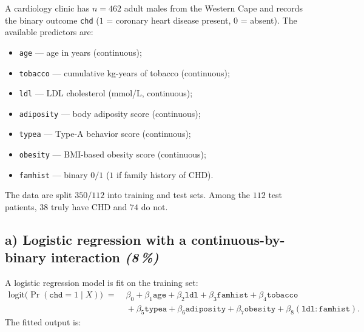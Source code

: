 \documentclass[11pt,a4paper]{article}
\newcommand{\subpoints}[1]{\textit{(#1\,\%)}}
\begin{document}
A cardiology clinic has $n = 462$ adult males from the Western Cape and records the binary outcome \texttt{chd} ($1$ = coronary heart disease present, $0$ = absent). The available predictors are:
\begin{itemize}
  \item \texttt{age} --- age in years (continuous);
  \item \texttt{tobacco} --- cumulative kg-years of tobacco (continuous);
  \item \texttt{ldl} --- LDL cholesterol (mmol/L, continuous);
  \item \texttt{adiposity} --- body adiposity score (continuous);
  \item \texttt{typea} --- Type-A behavior score (continuous);
  \item \texttt{obesity} --- BMI-based obesity score (continuous);
  \item \texttt{famhist} --- binary $0/1$ ($1$ if family history of CHD).
\end{itemize}
The data are split $350 / 112$ into training and test sets. Among the $112$ test patients, $38$ truly have CHD and $74$ do not.

\subsection*{a) Logistic regression with a continuous-by-binary interaction \subpoints{8}}

A logistic regression model is fit on the training set:
\begin{align*}
\mathrm{logit}\bigl(\Pr(\texttt{chd} = 1 \mid X)\bigr) \;=\;& \beta_0 + \beta_1 \texttt{age} + \beta_2 \texttt{ldl} + \beta_3 \texttt{famhist} + \beta_4 \texttt{tobacco} \\
&{}+ \beta_5 \texttt{typea} + \beta_6 \texttt{adiposity} + \beta_7 \texttt{obesity} + \beta_8 (\texttt{ldl}\!:\!\texttt{famhist}).
\end{align*}
The fitted output is:
\end{document}

